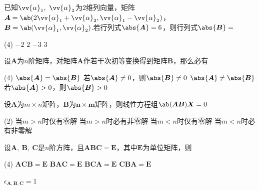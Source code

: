 \begin{exercise}
    已知$\vv{\alpha}_1,\ \vv{\alpha}_2$为$2$维列向量，矩阵$\boldsymbol{A}=\ab(2\vv{\alpha}_1+\vv{\alpha}_2,\vv{\alpha}_1-\vv{\alpha}_2)$，$\boldsymbol{B}=\ab(\vv{\alpha}_1,\vv{\alpha}_2)$.若行列式$\abs{\boldsymbol{A}}=6$，则行列式$\abs{\boldsymbol{B}}=$
    \begin{tasks}(4)
        \task $-2$
        \task $2$
        \task $-3$
        \task $3$
    \end{tasks}
\end{exercise}
\begin{solution}
    
\end{solution}

\begin{exercise}
    设$\boldsymbol{A}$为$n$阶矩阵，对矩阵$\boldsymbol{A}$作若干次初等变换得到矩阵$\boldsymbol{B}$，那么必有\ans{}
    \begin{tasks}(4)
        \task $\abs{\boldsymbol{A}}=\abs{\boldsymbol{B}}$
        \task 若$\abs{\boldsymbol{A}}\neq 0$，则$\abs{\boldsymbol{B}}\neq 0$
        \task $\abs{\boldsymbol{A}}\neq\abs{\boldsymbol{B}}$
        \task 若$\abs{\boldsymbol{A}}>0$，则$\abs{\boldsymbol{B}}>0$
    \end{tasks}
\end{exercise}
\begin{solution}
    
\end{solution}

\begin{exercise}
    设$\boldsymbol{A}$为$m\times n$矩阵，$\boldsymbol{B}$为$\boldsymbol{n\times m}$矩阵，则线性方程组$\ab(\boldsymbol{AB})\boldsymbol{X}=0$\ans{}
    \begin{tasks}(2)
        \task 当$m>n$时仅有零解
        \task 当$m>n$时必有非零解
        \task 当$m<n$时仅有零解
        \task 当$m<n$时必有非零解
    \end{tasks}
\end{exercise}
\begin{solution}
    
\end{solution}

\begin{exercise}
    设$\boldsymbol{A},\ \boldsymbol{B},\ \boldsymbol{C}$是$n$阶方阵，且$\boldsymbol{ABC}=\boldsymbol{E}$，其中$\boldsymbol{E}$为单位矩阵，则
    \begin{tasks}(4)
        \task $\boldsymbol{ACB}=\boldsymbol{E}$
        \task $\boldsymbol{BAC}=\boldsymbol{E}$
        \task $\boldsymbol{BCA}=\boldsymbol{E}$
        \task $\boldsymbol{CBA}=\boldsymbol{E}$
    \end{tasks}
\end{exercise}
\begin{solution}
    $\epsilon_{\boldsymbol{A,B,C}}=1$
\end{solution}

